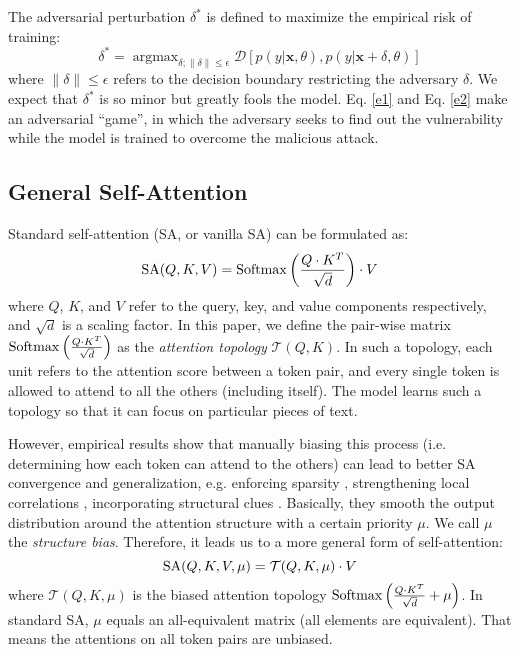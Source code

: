 \documentclass[letterpaper]{article} \usepackage{aaai23}  \usepackage{times}  \usepackage{helvet}  \usepackage{courier}  \usepackage[hyphens]{url}  \usepackage{graphicx} \urlstyle{rm} \def\UrlFont{\rm}  \usepackage{natbib}  \usepackage{caption} \frenchspacing  \setlength{\pdfpagewidth}{8.5in}  \setlength{\pdfpageheight}{11in}  \usepackage{algorithm}
\begin{document}
The adversarial perturbation $ \delta^* $ is defined to maximize the empirical risk of training:
\begin{equation}
\delta^* = \mathop{\arg\max}_{\delta;\parallel \delta \parallel \le \epsilon} \mathcal D \left[p(y|\mathbf x,\theta),p(y|\mathbf x+\delta,\theta)\right]
\label{e2}
\end{equation}
where $ \parallel \delta \parallel \le \epsilon $ refers to the decision boundary restricting the adversary $ \delta $. We expect that $ \delta^* $ is so minor but greatly fools the model. Eq. \ref{e1} and Eq. \ref{e2} make an adversarial ``game'', in which the adversary seeks to find out the vulnerability while the model is trained to overcome the malicious attack.

\subsection{General Self-Attention}

Standard self-attention (SA, or vanilla SA) \citep{DBLP:conf/nips/VaswaniSPUJGKP17} can be formulated as:
\begin{equation}
{\rm SA}(Q,K,V)={\rm Softmax}\left(\frac{Q \cdot K^{T}}{\sqrt{d}}\right) \cdot V
\label{e3}
\end{equation}
where $ Q $, $ K $, and $ V $ refer to the query, key, and value components respectively, and $ \sqrt{d} $ is a scaling factor. In this paper, we define the pair-wise matrix $ {\rm Softmax}\left(\frac{Q \cdot K^{T}}{\sqrt{d}}\right) $ as the \textit{attention topology} $ \mathcal T(Q,K) $. In such a topology, each unit refers to the attention score between a token pair, and every single token is allowed to attend to all the others (including itself). The model learns such a topology so that it can focus on particular pieces of text.

However, empirical results show that manually biasing this process (i.e. determining how each token can attend to the others) can lead to better SA convergence and generalization, e.g. enforcing sparsity \citep{DBLP:conf/icml/ShiGRXLLK21}, strengthening local correlations \citep{DBLP:conf/acl/YouSI20}, incorporating structural clues \citep{DBLP:conf/acl/WuZZ21}. Basically, they smooth the output distribution around the attention structure with a certain priority $ \mu $. We call $ \mu $ the \textit{structure bias}. Therefore, it leads us to a more general form of self-attention:
\begin{equation}
{\rm SA}(Q,K,V,\mu)=\mathcal T(Q,K,\mu) \cdot V
\label{e4}
\end{equation}
where $ \mathcal T(Q,K,\mu) $ is the biased attention topology $ {\rm Softmax}\left(\frac{Q \cdot K^{T}}{\sqrt{d}}+\mu\right) $. In standard SA, $ \mu $ equals an all-equivalent matrix (all elements are equivalent). That means the attentions on all token pairs are unbiased.
\end{document}
